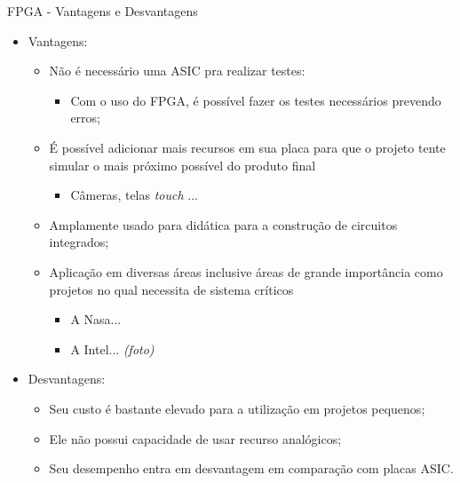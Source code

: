 \documentclass[aspectratio=169]{beamer}
\begin{document}
	\begin{frame}{FPGA - Vantagens e Desvantagens}
		\begin{itemize}
			\item Vantagens:
			\begin{itemize}
				\setlength\itemsep{0.2em}
				\item Não é necessário uma ASIC pra realizar testes:
				\begin{itemize}
					\item Com o uso do FPGA, é possível fazer os testes necessários prevendo erros;
				\end{itemize}
				
				\item É possível adicionar mais recursos em sua placa para que o projeto tente simular o mais próximo possível do produto final
				\begin{itemize}
					\item Câmeras, telas \textit{touch} ...
				\end{itemize}
				
				\item Amplamente usado para didática para a construção de circuitos integrados;
				
				\item Aplicação em diversas áreas inclusive áreas de grande importância como projetos no qual necessita de sistema críticos
				\begin{itemize}
					\item A Nasa...
					\item A Intel... \textit{(foto)}
				\end{itemize}
			\end{itemize}
			
				\bigskip
			
			\item Desvantagens:
			\begin{itemize}
				\setlength\itemsep{0.2em}
				\item Seu custo é bastante elevado para a utilização em projetos pequenos;
				
				\item Ele não possui capacidade de usar recurso analógicos;
				
				\item Seu desempenho entra em desvantagem em comparação com placas ASIC.
			\end{itemize}
		\end{itemize}
	\end{frame}
	
\end{document}
